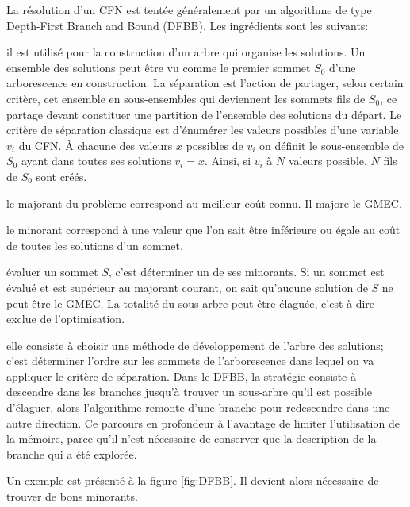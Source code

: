 La résolution d'un CFN est tentée généralement par un algorithme de type  \og Depth-First Branch and Bound \fg (DFBB). Les ingrédients sont les suivants:
\begin{description}[leftmargin=*] 
\item [un principe de séparation:] il est utilisé pour la construction d'un arbre qui organise les solutions. Un ensemble des solutions peut être vu comme le premier sommet $S_0$ d'une arborescence en construction. La séparation est l'action de partager, selon certain critère, cet ensemble en sous-ensembles  qui deviennent les sommets fils de $S_0$, ce partage devant constituer une partition de l'ensemble des solutions du départ. Le critère de séparation classique est d'énumérer les valeurs possibles d'une variable $v_i$ du  CFN. À chacune des valeurs $x$ possibles de $v_i$ on définit le sous-ensemble de $S_0$ ayant dans toutes ses solutions $v_i=x$. Ainsi, si $v_i$ à $N$ valeurs possible, $N$ fils de $S_0$ sont créés.
\item [un majorant:] le majorant du problème correspond au meilleur coût connu. Il majore le GMEC.
\item [un minorant d'un sommet:] le minorant correspond à une valeur que l'on sait être inférieure ou égale au coût de toutes les solutions d'un sommet.  
\item [un principe d'évaluation:] évaluer un sommet $S$, c'est déterminer un de ses minorants. Si un sommet est évalué et est supérieur au majorant courant, on sait qu'aucune solution de $S$ ne peut être le GMEC. La totalité du sous-arbre peut être élaguée, c'est-à-dire exclue de l'optimisation.  
\item [une stratégie de développement:] elle consiste à choisir une méthode de développement de l'arbre des solutions; c'est déterminer l'ordre sur les sommets de l'arborescence dans lequel on va appliquer le critère de séparation. Dans le DFBB, la stratégie consiste à descendre dans les branches jusqu'à trouver un sous-arbre qu'il est possible d'élaguer, alors l'algorithme remonte d'une branche pour redescendre dans une autre direction. Ce parcours en profondeur à l'avantage de limiter l'utilisation de la mémoire, parce qu'il n'est nécessaire de conserver que la description de la branche qui a été explorée.
\end{description}  
Un exemple est présenté à la figure \ref{fig:DFBB}. Il devient alors nécessaire de trouver de bons minorants.

